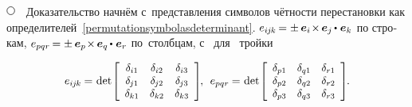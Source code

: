 \begin{otherlanguage}{russian}

\noindent
${ \tikz[baseline=-1ex] \draw [line width=.5pt, color=black, fill=white] (0, 0) circle (.8ex);
\hspace{.6em} }$
Доказательство
начнём
с~представления
символов чётности перестановки
как определителей~\eqref{permutationsymbolasdeterminant}.
${ e_{i\hspace{-0.1ex}j\hspace{-0.1ex}k} \hspace{-0.2ex}
= \pm \hspace{.4ex}
\bm{e}_i \hspace{-0.36ex} \times \hspace{-0.2ex} \bm{e}_j \hspace{-0.15ex} \dotp \hspace{.1ex} \bm{e}_k }$ по строкам,
${ e_{pqr} \hspace{-0.2ex}
= \pm \hspace{.4ex}
\bm{e}_p \hspace{-0.36ex} \times \hspace{-0.2ex} \bm{e}_q \hspace{-0.15ex} \dotp \hspace{.1ex} \bm{e}_r }$ по~столбцам,
с~\inquotes{$-$} для~ тройки

\nopagebreak\vspace{-0.25em}
\begin{equation*}
e_{i\hspace{-0.1ex}j\hspace{-0.1ex}k} \hspace{-0.1ex} = \hspace{.1ex}
\operatorname{det}\hspace{-0.25ex} \scalebox{0.96}[0.96]{$\left[\begin{array}{ccc}
\delta_{i1} & \delta_{i2} & \delta_{i3} \\
\delta_{\hspace{-0.1ex}j1} & \delta_{\hspace{-0.1ex}j2} & \delta_{\hspace{-0.1ex}j3} \\
\delta_{k1} & \delta_{k2} & \delta_{k3}
\end{array}\right]$} \hspace{-0.25ex}, \:\:
e_{pqr} \hspace{-0.1ex} = \hspace{.1ex}
\operatorname{det}\hspace{-0.25ex} \scalebox{0.96}[0.96]{$\left[\begin{array}{ccc}
\delta_{p1} & \delta_{q1} & \delta_{r1} \\
\delta_{p2} & \delta_{q2} & \delta_{r2} \\
\delta_{p3} & \delta_{q3} & \delta_{r3}
\end{array}\right]$}
\hspace{-0.2ex} .
\end{equation*}


\end{otherlanguage}

